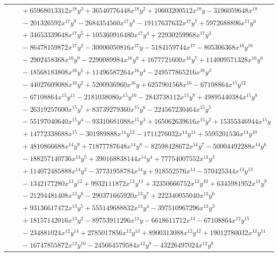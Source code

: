 \documentclass[11pt]{article}
\begin{document}
\begin{longtable}{@{}ll@{}}
 & $\quad +65968013312x^{18}y^{3}+36540776448x^{18}y^{2}+10603200512x^{18}y-3196059648x^{18}$\\
 & $\quad -201326592x^{17}y^{9}-2684354560x^{17}y^{8}-19117637632x^{17}y^{7}+5972688896x^{17}y^{6}$\\
 & $\quad +34653339648x^{17}y^{5}+105360916480x^{17}y^{4}+22930259968x^{17}y^{3}$\\
 & $\quad -86478159872x^{17}y^{2}-30006050816x^{17}y-5184159744x^{17}-805306368x^{16}y^{10}$\\
 & $\quad -2902458368x^{16}y^{9}-2290089984x^{16}y^{8}+1677721600x^{16}y^{7}+114009571328x^{16}y^{6}$\\
 & $\quad -18568183808x^{16}y^{5}+11496587264x^{16}y^{4}-249577865216x^{16}y^{3}$\\
 & $\quad -44027609088x^{16}y^{2}+5200936960x^{16}y+6257901568x^{16}-67108864x^{15}y^{12}$\\
 & $\quad -67108864x^{15}y^{11}-2181038080x^{15}y^{10}-2843738112x^{15}y^{9}+49895440384x^{15}y^{8}$\\
 & $\quad -26319257600x^{15}y^{7}+83739279360x^{15}y^{6}-224567230464x^{15}y^{5}$\\
 & $\quad -55197040640x^{15}y^{4}-93310681088x^{15}y^{3}+165062639616x^{15}y^{2}+15355346944x^{15}y$\\
 & $\quad +14772338688x^{15}-301989888x^{14}y^{12}-1711276032x^{14}y^{11}+5595201536x^{14}y^{10}$\\
 & $\quad +4810866688x^{14}y^{9}+71877787648x^{14}y^{8}-82598428672x^{14}y^{7}-50004492288x^{14}y^{6}$\\
 & $\quad -188257140736x^{14}y^{5}+390168838144x^{14}y^{4}+77754007552x^{14}y^{3}$\\
 & $\quad +114072485888x^{14}y^{2}-37731958784x^{14}y+918552576x^{14}-570425344x^{13}y^{13}$\\
 & $\quad -1342177280x^{13}y^{12}+9932111872x^{13}y^{11}+32350666752x^{13}y^{10}+6345981952x^{13}y^{9}$\\
 & $\quad -21294481408x^{13}y^{8}-290371665920x^{13}y^{7}+222340055040x^{13}y^{6}$\\
 & $\quad +93136617472x^{13}y^{5}+555149688832x^{13}y^{4}-397510967296x^{13}y^{3}$\\
 & $\quad +18157142016x^{13}y^{2}-89753911296x^{13}y-6618611712x^{13}-67108864x^{12}y^{15}$\\
 & $\quad -234881024x^{12}y^{14}+2785017856x^{12}y^{13}+8900313088x^{12}y^{12}+19012780032x^{12}y^{11}$\\
 & $\quad -16747855872x^{12}y^{10}-245664579584x^{12}y^{9}-43226497024x^{12}y^{8}$\\

\end{longtable}
\end{document}
